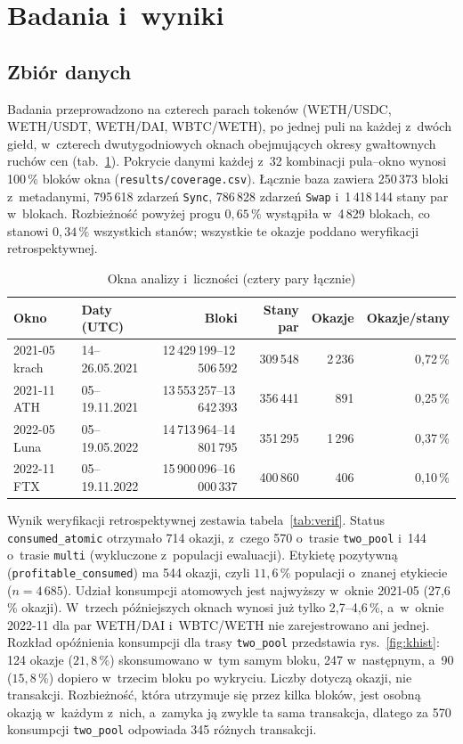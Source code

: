 \newpage
\section{Badania i~wyniki}

\subsection{Zbiór danych}

Badania przeprowadzono na czterech parach tokenów (WETH/USDC, WETH/USDT, WETH/DAI, WBTC/WETH), po
jednej puli na każdej z~dwóch giełd, w~czterech dwutygodniowych oknach obejmujących okresy
gwałtownych ruchów cen (tab.~\ref{tab:windows}). Pokrycie danymi każdej z~32 kombinacji pula--okno
wynosi 100\,\% bloków okna (\texttt{results/coverage.csv}). Łącznie baza zawiera 250\,373 bloki
z~metadanymi, 795\,618 zdarzeń \texttt{Sync}, 786\,828 zdarzeń \texttt{Swap} i~1\,418\,144 stany
par w~blokach. Rozbieżność powyżej progu $0{,}65\,\%$ wystąpiła w~4\,829 blokach, co stanowi
$0{,}34\,\%$ wszystkich stanów; wszystkie te okazje poddano weryfikacji retrospektywnej.

\begin{table}[H]\centering\small
\caption{Okna analizy i~liczności (cztery pary łącznie)}\label{tab:windows}
\begin{tabular}{llrrrr}
\toprule
Okno & Daty (UTC) & Bloki & Stany par & Okazje & Okazje/stany \\
\midrule
2021-05 krach & 14--26.05.2021 & 12\,429\,199--12\,506\,592 & 309\,548 & 2\,236 & 0{,}72\,\% \\
2021-11 ATH   & 05--19.11.2021 & 13\,553\,257--13\,642\,393 & 356\,441 & 891   & 0{,}25\,\% \\
2022-05 Luna  & 05--19.05.2022 & 14\,713\,964--14\,801\,795 & 351\,295 & 1\,296 & 0{,}37\,\% \\
2022-11 FTX   & 05--19.11.2022 & 15\,900\,096--16\,000\,337 & 400\,860 & 406   & 0{,}10\,\% \\
\bottomrule
\end{tabular}
\end{table}

Wynik weryfikacji retrospektywnej zestawia tabela~\ref{tab:verif}. Status
\texttt{consumed\_atomic} otrzymało 714 okazji, z~czego 570 o~trasie \texttt{two\_pool}
i~144 o~trasie \texttt{multi} (wykluczone z~populacji ewaluacji). Etykietę pozytywną
(\texttt{profitable\_consumed}) ma 544 okazji, czyli $11{,}6\,\%$ populacji o~znanej etykiecie
($n=4\,685$). Udział konsumpcji atomowych jest najwyższy w~oknie 2021-05 (27,6\,\% okazji). W~trzech
późniejszych oknach wynosi już tylko 2,7--4,6\,\%, a~w~oknie 2022-11 dla par WETH/DAI
i~WBTC/WETH nie zarejestrowano ani jednej. Rozkład opóźnienia konsumpcji dla trasy
\texttt{two\_pool} przedstawia rys.~\ref{fig:khist}: 124 okazje ($21{,}8\,\%$) skonsumowano
w~tym samym bloku, 247 w~następnym, a~90 ($15{,}8\,\%$) dopiero w~trzecim bloku po wykryciu.
Liczby dotyczą okazji, nie transakcji. Rozbieżność, która utrzymuje się przez kilka bloków, jest
osobną okazją w~każdym z~nich, a~zamyka ją zwykle ta sama transakcja, dlatego za 570 konsumpcji
\texttt{two\_pool} odpowiada 345 różnych transakcji.

